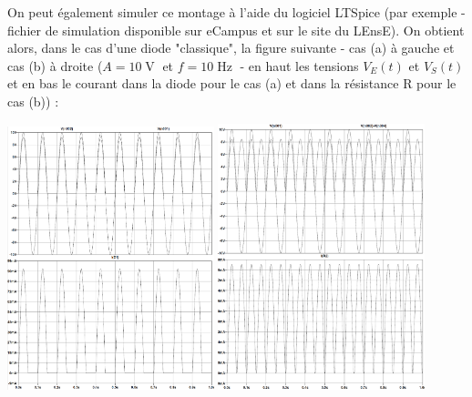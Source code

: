 \documentclass[a4paper,french]{paper}
\begin{document}
	On peut également simuler ce montage à l'aide du logiciel LTSpice (par exemple - fichier de simulation disponible sur eCampus et sur le site du LEnsE). On obtient alors, dans le cas d'une diode "classique", la figure suivante - cas (a) à gauche et cas (b) à droite ($A = 10\operatorname{V}$ et $f = 10\operatorname{Hz}$ - en haut les tensions $V_E(t)$ et $V_S(t)$ et en bas le courant dans la diode pour le cas (a) et dans la résistance R pour le cas (b)) :

	\begin{center}
		\includegraphics[width=6cm]{images/TD/redresseur_001_b_cor.png}\hfill
		\includegraphics[width=6cm]{images/TD/redresseur_001_c_cor.png}
	\end{center}	
	
	
	
\end{document}
